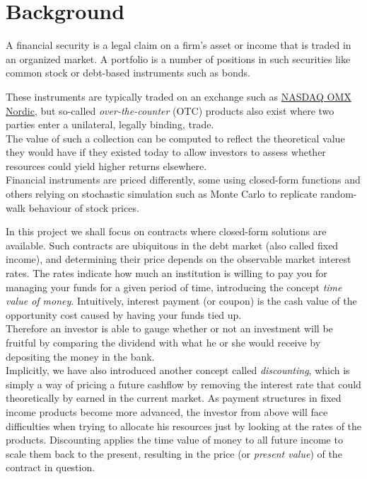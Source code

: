 \chapter{Background}

A financial security is a legal claim on a firm's asset or income 
that is traded in an organized market\cite{alexander2008market}.
A portfolio is a number of positions in such securities like common
stock or debt-based instruments such as bonds.

These instruments are typically traded on an exchange such as 
\href{http://www.nasdaqomxnordic.com/}{NASDAQ OMX Nordic}, but so-called
\emph{over-the-counter} (OTC) products also exist where two parties enter
a unilateral, legally binding, trade.\\
The value of such a collection can be computed to reflect the theoretical 
value they would have if they existed today to allow investors to assess
whether resources could yield higher returns elsewhere.\\

Financial instruments are priced differently, some using closed-form functions
and others relying on stochastic simulation such as Monte Carlo to replicate 
random-walk behaviour of stock prices\cite{HULL}.

In this project we shall focus on contracts where closed-form solutions are
available. Such contracts are ubiquitous in the debt market (also called fixed
income), and determining their price depends on the observable market interest
rates. The rates indicate how much an institution is willing to pay you for
managing your funds for a given period of time, introducing the concept
\emph{time value of money}. Intuitively, interest payment (or coupon) is
the cash value of the opportunity cost caused by having your funds tied up.\\
Therefore an investor is able to gauge whether or not an investment will be
fruitful by comparing the dividend with what he or she would receive by 
depositing the money in the bank.\\

Implicitly, we have also introduced another concept called \emph{discounting},
which is simply a way of pricing a future cashflow by removing the interest
rate that could theoretically by earned in the current market. As payment structures
in fixed income products become more advanced, the investor from above will 
face difficulties when trying to allocate his resources just by looking at the
rates of the products. Discounting applies the time value of money to all
future income to scale them back to the present, resulting in the price (or
\emph{present value}) of the contract in question. 

